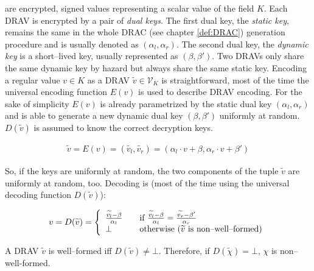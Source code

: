  are encrypted, signed values
representing a scalar value of the field $K$. Each DRAV is encrypted by a pair
of \emph{dual keys}. The first dual key, the \emph{static key}, remains the same
in the whole DRAC (see chapter \ref{def:DRAC}) generation procedure and is
usually denoted as $(\alpha_l, \alpha_r)$. The second dual key, the
\emph{dynamic key} is a short--lived key, usually represented as $(\beta,
\beta')$. Two DRAVs only share the same dynamic key by hazard but always share
the same static key. Encoding a regular value $v \in K$ as a DRAV
$\widetilde{v} \in \mathcal{V}_K$ is straightforward, most of the time the
universal encoding function $E(v)$ is used to describe DRAV encoding. For the
sake of simplicity $E(v)$ is already parametrized by the static dual key
$(\alpha_l, \alpha_r)$ and is able to generate a new dynamic dual key $(\beta,
\beta')$ uniformly at random. $D(\widetilde{v})$ is assumed to know the correct
decryption keys.

\begin{align*}
  \widetilde{v} = E(v) = (\widetilde{v_l}, \widetilde{v_r}) =
    (\alpha_l \cdot v + \beta, \alpha_r \cdot v + \beta')
\end{align*}

\noindent{}So, if the keys are uniformly at random, the two components of the
tuple $\widetilde{v}$ are uniformly at random, too. Decoding is (most of the
time using the universal decoding function $D(\widetilde{v})$):

\begin{align*}
  v = D(\widetilde{v}) =
  \left\{
    \begin{array}{l l}
      \frac{\widetilde{v_l} - \beta}{\alpha_l} & \quad
      \text{if}~\frac{\widetilde{v_l} - \beta}{\alpha_l} =
      \frac{\widetilde{v_r} - \beta'}{\alpha_r}\\
      \bot & \quad \text{otherwise ($\widetilde{v}$ is non--well--formed)}\\
    \end{array}\right.
\end{align*}



A DRAV $\widetilde{v}$ is well--formed iff $D(\widetilde{v}) \neq \bot$.
Therefore, if $D(\widetilde{\chi}) = \bot$, $\chi$ is non--well-formed.


\label{sec:direct-DRAV-arithmetic}


